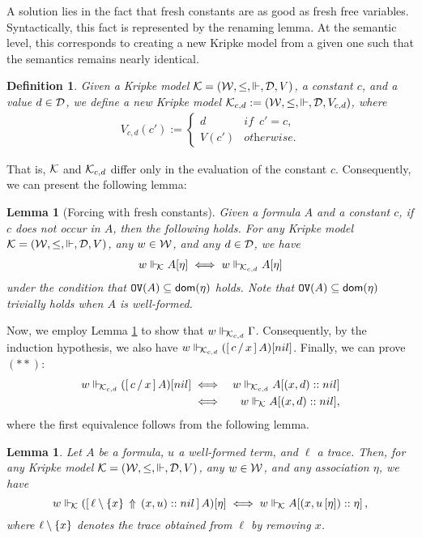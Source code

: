 \documentclass{kms-j}
\theoremstyle{plain}
\newtheorem{lem}[thm]{Lemma}
\newtheorem{defi}[thm]{Definition}
\theoremstyle{remark}
\begin{document}
A solution lies in the fact that fresh constants are as good as fresh free variables. Syntactically, this fact is represented by the renaming lemma. At the semantic level, this corresponds to creating a new Kripke model from a given one such that the semantics remains nearly identical.

\begin{defi}
  Given a Kripke model $\calk = (\calw, \le, \Vd, \cald, V)$, a constant $c$, and a value $d \in \cald$, we define a new Kripke model $\calk_{c,d} := (\calw, \le,\Vd, \cald, V_{c,d})$, where
  \begin{eqnarray*}
    V_{c,d} (c') :=
    \left \{
    \begin{array}{ll}
      d & \textit{if }\, c' = c, \\
      V(c') & \textit{otherwise.}
    \end{array}
    \right .
  \end{eqnarray*}
\end{defi}
That is, $\calk$ and $\calk_{c,d}$ differ only in the evaluation of the constant $c$. Consequently, we can present the following lemma:

\begin{lem}[Forcing with fresh constants]\label{lem:create-kripke}
  Given a formula $A$ and a constant $c$, if $c$ does not occur
  in $A$, then the following holds. For any Kripke model $\calk = (\calw,
  \le, \Vd, \cald, V)$, any $w \in \calw$, and any $d \in \cald$, we
  have
  \begin{eqnarray*}
    w \Vd_{\!\calk} A [\eta] \iff w \Vd_{\!\calk_{c,d}} A [\eta]
  \end{eqnarray*}
under the condition that $\tPH (A) \tm \dom (\eta)$ holds.
Note that $\tPH (A) \tm \dom (\eta)$ trivially holds when $A$ is well-formed.
\end{lem}

Now, we employ Lemma \ref{lem:create-kripke} to show that
$w \Vd_{\!\calk_{c,d}} \Ga$. Consequently,  by the induction hypothesis, we
also have $w \Vd_{\!\calk_{c,d}} (\substs{A}{x}{c}) [nil]$. Finally, we
can prove $(\ast\ast)$:
\begin{eqnarray}
  w \Vd_{\!\calk_{c,d}} (\substs{A}{x}{c}) [nil] & \iff & w \Vd_{\!\calk_{c,d}} A [(x,d)::nil] \nonumber\\
  & \iff & w \Vd_{\!\calk} A [(x,d)::nil], \nonumber
\end{eqnarray}
where the first equivalence follows from the following lemma.

\begin{lem}
Let $A$ be a formula, $u$ a well-formed term, and $\ell$ a trace.
Then, for any Kripke model $\calk = (\calw, \le, \Vd, \cald, V)$, any $w \in \calw$, and
any association $\eta$, we have
\[
w \Vd_{\!\calk} (\substa{A}{(x, u) :: nil }{\ell \setminus \sing{x}}) [\eta]
\iff w \Vd_{\!\calk} A [(x, u\,[\eta]):: \eta]\, ,
\]
where $\ell\setminus\sing{x}$ denotes the trace obtained from $\ell$ by removing $x$.
\end{lem}
\end{document}
